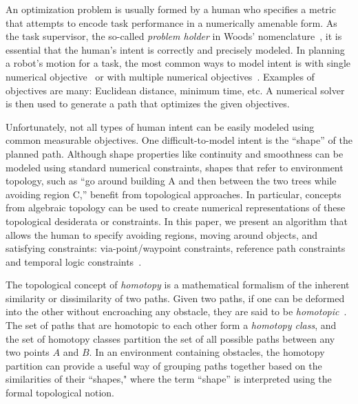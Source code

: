 \documentclass[letterpaper, 10 pt, conference]{ieeeconf}
\begin{document}
An optimization problem is usually formed by a human who specifies a metric that attempts to encode task performance in a numerically amenable form.
As the task supervisor, the so-called {\em problem holder} in Woods' nomenclature~\cite{woods2004envisioning}, it is essential that the human's intent is correctly and precisely modeled.
In planning a robot's motion for a task, the most common ways to model intent is with single numerical objective~\cite{6974170} or with multiple numerical objectives~\cite{yi2014supporting}.  Examples of objectives are many: Euclidean distance, minimum time, etc.
A numerical solver is then used to generate a path that optimizes the given objectives.

Unfortunately, not all types of human intent can be easily modeled using common measurable objectives.
One difficult-to-model intent is the ``shape'' of the planned path.
Although shape properties like continuity and smoothness can be modeled using standard numerical constraints, shapes that refer to environment topology, such as ``go around building A and then between the two trees while avoiding region C,'' benefit from topological approaches.
In particular, concepts from algebraic topology can be used to create numerical representations of these topological desiderata or constraints.
In this paper, we present an algorithm that allows the human to specify avoiding regions, moving around objects, and satisfying constraints: via-point/waypoint constraints, reference path constraints~\cite{6974170} and temporal logic constraints~\cite{5650896}.

The topological concept of \emph{homotopy} is a mathematical formalism of the inherent similarity or dissimilarity of two paths.
Given two paths, if one can be deformed into the other without encroaching any obstacle, they are said to be \emph{homotopic}~\cite{Hernandez201544}.
The set of paths that are homotopic to each other form a \emph{homotopy class}, and the  set of homotopy classes partition the set of all possible paths between any two points $A$ and $B$.
In an environment containing obstacles, the homotopy partition can provide a useful way of grouping paths together based on the similarities of their ``shapes," where the term ``shape'' is interpreted using the formal topological notion.
\end{document}
